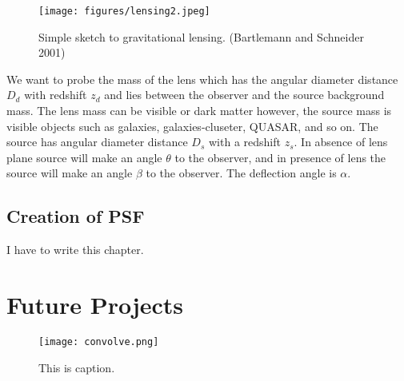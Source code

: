 \documentclass[12pt, preprint,letterpaper]{article}
\begin{document}
 \begin{figure}[h!]\label{[fig:lensing]}
    \centering
    \texttt{[image: figures/lensing2.jpeg]}
    \caption{Simple sketch to gravitational lensing. (Bartlemann and Schneider 2001)} %
\end{figure}

We want to probe the mass of the lens which has the angular diameter distance
 $D_d$ with redshift $z_d$ and lies between the observer and the source background mass.
 The lens mass can be visible or dark matter however, the
 source mass is visible objects such as galaxies, galaxies-cluseter, QUASAR, and so on.
 The source has angular diameter distance $D_s$ with a redshift $z_s$.
 In absence of lens plane source will make an angle $\theta$ to the observer,
 and in presence of lens the source will make an angle $\beta$ to the observer.
 The deflection angle is $\alpha$.








%
%
%
%
\subsection{Creation of PSF}\label{subsec:}
I have to write this chapter.







%
%
%
%
\section{Future Projects}\label{sec:sec2}
 \begin{figure}[h!]
 \centering
  \texttt{[image: convolve.png]}
 \caption{This is caption.}
 \end{figure}
\newpage{}
%
%
%
%
\end{document}
